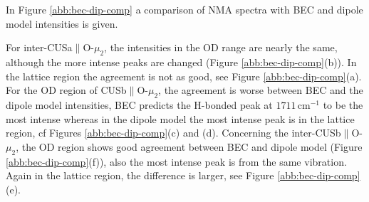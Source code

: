 \documentclass[11pt,DIV=13,BCOR=5mm,a4paper,headinclude]{scrbook}
\begin{document}
In Figure \ref{abb:bec-dip-comp} a comparison of NMA spectra with BEC and dipole model intensities is given.

For inter-CUSa$\parallel$O-$\mu_2$, the intensities in the OD range are nearly the same, although the more intense peaks are changed (Figure \ref{abb:bec-dip-comp}(b)).
In the lattice region the agreement is not as good, see Figure \ref{abb:bec-dip-comp}(a).
For the OD region of CUSb$\parallel$O-$\mu_2$, the agreement is worse between BEC and the dipole model intensities, BEC predicts the H-bonded peak at $1711\,$cm$^{-1}$ to be the most intense whereas in the dipole model the most intense peak is in the lattice region, cf Figures \ref{abb:bec-dip-comp}(c) and (d). %
Concerning the inter-CUSb$\parallel$O-$\mu_2$, the OD region shows good agreement between BEC and dipole model (Figure \ref{abb:bec-dip-comp}(f)), also the most intense peak is from the same vibration.
Again in the lattice region, the difference is larger, see Figure \ref{abb:bec-dip-comp}(e).
\end{document}
